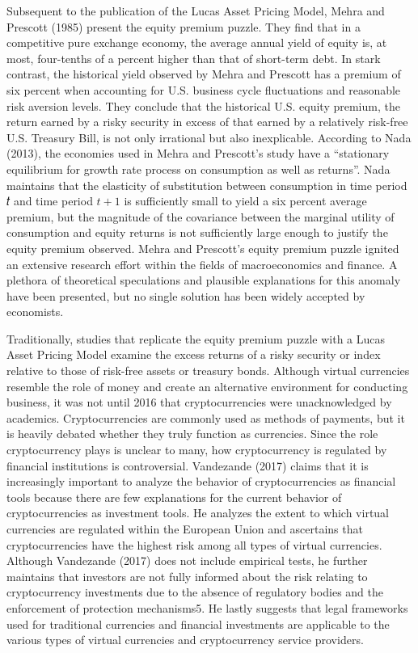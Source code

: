 \documentclass[]{article}
\begin{document}
Subsequent to the publication of the Lucas Asset Pricing Model, Mehra
and Prescott (1985) present the equity premium puzzle. They find that in
a competitive pure exchange economy, the average annual yield of equity
is, at most, four-tenths of a percent higher than that of short-term
debt. In stark contrast, the historical yield observed by Mehra and
Prescott has a premium of six percent when accounting for U.S. business
cycle fluctuations and reasonable risk aversion levels. They conclude
that the historical U.S. equity premium, the return earned by a risky
security in excess of that earned by a relatively risk-free U.S.
Treasury Bill, is not only irrational but also inexplicable. According
to Nada (2013), the economies used in Mehra and Prescott's study have a
``stationary equilibrium for growth rate process on consumption as well
as returns''. Nada maintains that the elasticity of substitution between
consumption in time period 𝑡 and time period \(t + 1\) is sufficiently
small to yield a six percent average premium, but the magnitude of the
covariance between the marginal utility of consumption and equity
returns is not sufficiently large enough to justify the equity premium
observed. Mehra and Prescott's equity premium puzzle ignited an
extensive research effort within the fields of macroeconomics and
finance. A plethora of theoretical speculations and plausible
explanations for this anomaly have been presented, but no single
solution has been widely accepted by economists.

Traditionally, studies that replicate the equity premium puzzle with a
Lucas Asset Pricing Model examine the excess returns of a risky security
or index relative to those of risk-free assets or treasury bonds.
Although virtual currencies resemble the role of money and create an
alternative environment for conducting business, it was not until 2016
that cryptocurrencies were unacknowledged by academics. Cryptocurrencies
are commonly used as methods of payments, but it is heavily debated
whether they truly function as currencies. Since the role cryptocurrency
plays is unclear to many, how cryptocurrency is regulated by financial
institutions is controversial. Vandezande (2017) claims that it is
increasingly important to analyze the behavior of cryptocurrencies as
financial tools because there are few explanations for the current
behavior of cryptocurrencies as investment tools. He analyzes the extent
to which virtual currencies are regulated within the European Union and
ascertains that cryptocurrencies have the highest risk among all types
of virtual currencies. Although Vandezande (2017) does not include
empirical tests, he further maintains that investors are not fully
informed about the risk relating to cryptocurrency investments due to
the absence of regulatory bodies and the enforcement of protection
mechanisms5. He lastly suggests that legal frameworks used for
traditional currencies and financial investments are applicable to the
various types of virtual currencies and cryptocurrency service
providers.
\end{document}
